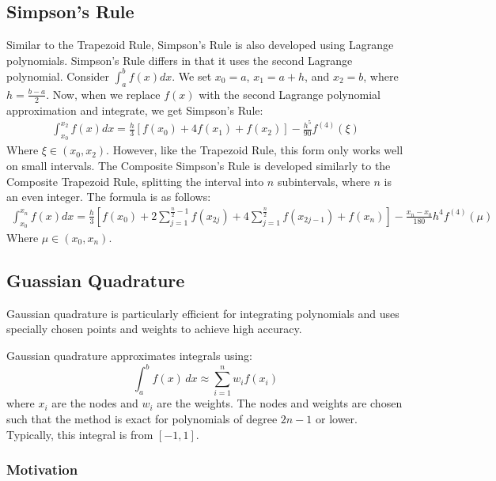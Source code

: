 \documentclass[12pt]{article}
\begin{document}
\subsection{Simpson's Rule}
Similar to the Trapezoid Rule, Simpson's Rule is also developed using Lagrange polynomials. Simpson's Rule differs in that 
it uses the second Lagrange polynomial. Consider $\int_{a}^{b} f(x)dx$. We set $x_0 = a$, $x_1 = a + h$, and $x_2 = b$, where $h = \frac{b - a}{2}$.
Now, when we replace $f(x)$ with the second Lagrange polynomial approximation and integrate, we get Simpson's Rule:
\begin{align*}
    \int_{x_0}^{x_2}f(x)dx = \frac{h}{3}[f(x_0) + 4f(x_1) + f(x_2)] - \frac{h^5}{90}f^{(4)}(\xi)
\end{align*}
Where $\xi \in (x_0, x_2)$. However, like the Trapezoid Rule, this form only works well on small intervals. The Composite Simpson's Rule is
developed similarly to the Composite Trapezoid Rule, splitting the interval into $n$ subintervals, where $n$ is an even integer.
The formula is as follows:
\begin{align*}
    \int_{x_0}^{x_n}f(x)dx = \frac{h}{3}[f(x_0) + 2\sum_{j=1}^{\frac{n}{2} - 1}f(x_{2j}) + 4\sum_{j=1}^{\frac{n}{2}}f(x_{2j - 1}) + f(x_n)] - \frac{x_n - x_0}{180}h^4f^{(4)}(\mu)
\end{align*}
Where $\mu \in (x_0, x_n)$.

\subsection{Guassian Quadrature}
Gaussian quadrature is particularly efficient for integrating polynomials and uses specially chosen points and weights to achieve high accuracy.

Gaussian quadrature approximates integrals using:
\[
	\int_a^b f(x) \, dx \approx \sum_{i=1}^n w_i f(x_i)
\]
where \( x_i \) are the nodes and $w_{i}$ are the weights.
The nodes and weights are chosen such that the method is exact for polynomials of degree $2n-1$ or lower.
Typically, this integral is from $[-1,1]$.

\subsubsection{Motivation}
\end{document}
